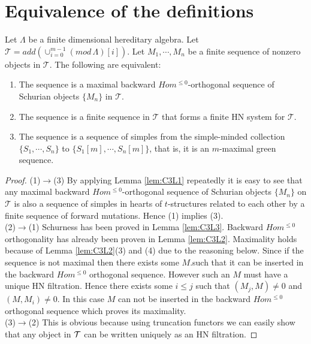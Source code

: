 \section{Equivalence of the definitions}
\begin{theorem}\label{C3TB}
\indent Let $\Lambda$ be a finite dimensional hereditary algebra. Let $\mathcal{T} = add(\cup_{i=0}^{m-1} (mod\,\Lambda)[i])$. Let $M_1,\cdots, M_n$ be a finite sequence of nonzero objects in $\mathcal{T}$. The following are equivalent:
\begin{enumerate}
\item The sequence is a maximal backward $Hom^{\leq 0}$-orthogonal sequence of Schurian objects $\{M_n\}$ in $\mathcal{T}$.
\item The sequence is a finite sequence in $\mathcal{T}$ that forms a finite HN system for $\mathcal{T}$.
\item The sequence is a sequence of simples from the simple-minded collection $\{S_1,\cdots, S_n\}$ to  $\{S_1[m],\cdots, S_n[m]\}$, that is, it is an $m$-maximal green sequence.
\end{enumerate}
\end{theorem}
\begin{proof}
\indent (1)$\to$(3) By applying Lemma \ref{lem:C3L1} repeatedly it is easy to see that any maximal backward $Hom^{\leq 0}$-orthogonal sequence of Schurian objects $\{M_n\}$ on $\mathcal{T}$ is also a sequence of simples in hearts of $t$-structures related to each other by a finite sequence of forward mutations. Hence (1) implies (3).\\
\indent (2)$\to$(1) Schurness has been proved in Lemma \ref{lem:C3L3}. Backward $Hom^{\leq 0}$ orthogonality has already been proven in Lemma \ref{lem:C3L2}. Maximality holds because of Lemma \ref{lem:C3L2}(3) and (4) due to the reasoning below. Since if the sequence is not maximal then there exists some $M$.such that it can be inserted in the backward $Hom^{\leq 0}$ orthogonal sequence. However such an $M$ must have a unique HN filtration. Hence there exists some $i\leq j$ such that $(M_j, M)\neq 0$ and $(M, M_i)\neq 0$. In this case $M$ can not be inserted in the backward $Hom^{\leq 0}$ orthogonal sequence which proves its maximality.\\
\indent (3)$\to$(2) This is obvious because using truncation functors we can easily show that any object in $\mathcal{T}$ can be written uniquely as an HN filtration. 
\end{proof}